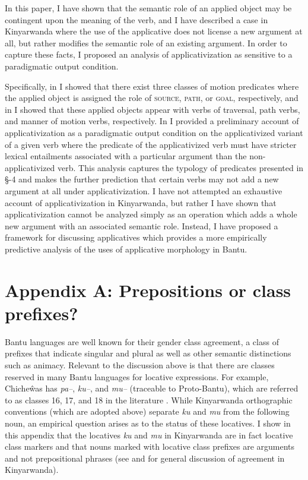 \documentclass[output=paper]{langsci/langscibook}
\begin{document}
In this paper, I have shown that the semantic role of an applied object may be contingent upon the meaning of the verb, and I have described a case in Kinyarwanda where the use of the applicative does not license a new argument at all, but rather modifies the semantic role of an existing argument. In order to capture these facts, I proposed an analysis of applicativization as sensitive to a paradigmatic output condition. 
 
Specifically, in  I showed that there exist three classes of motion predicates where the applied object is assigned the role of {\scshape source, path,} or {\scshape goal,} respectively, and in  I showed that  these applied objects appear with verbs of traversal, path verbs, and manner of motion verbs, respectively. In  I provided a preliminary account of applicativization as a paradigmatic output condition on the applicativized variant of a given verb where the predicate of the applicativized verb must have stricter lexical entailments associated with a particular argument than the non-applicativized verb. This analysis captures the typology of predicates presented in \S{}-4 and makes the further prediction that certain verbs may not add a new argument at all under applicativization. I have not attempted an exhaustive account of applicativization in Kinyarwanda, but rather I have shown that applicativization cannot be analyzed simply as an operation which adds a whole new argument with an associated semantic role. Instead, I have proposed a framework for discussing applicatives which provides a more empirically predictive analysis of the uses of applicative morphology in Bantu. 
 
 
 \section*{Appendix A: Prepositions or class prefixes?}
 
 Bantu languages are well known for their gender class agreement, a class of prefixes that indicate singular and plural as well as other semantic distinctions such as animacy. Relevant to the discussion above is that there are classes reserved in many Bantu languages for locative expressions. For example, Chicheŵas has \emph{pa--}, \emph{ku--}, and \emph{mu--} (traceable to Proto-Bantu), which are referred to as classes 16, 17, and 18 in the literature \citep{bresnan:1989,bresnan:1994,bresnanmchombo:1995,maho:1999,marten:2010}. While Kinyarwanda orthographic conventions (which are adopted above) separate \emph{ku} and \emph{mu} from the following noun, an empirical question arises as to the status of these locatives. I show in this appendix that the locatives \emph{ku} and \emph{mu} in Kinyarwanda are in fact locative class markers and that nouns marked with locative class prefixes are arguments and not prepositional phrases (see \citealt{Jerro2013} and \citealt{JerroWechsler2015} for general discussion of agreement in Kinyarwanda).
 
\end{document}
